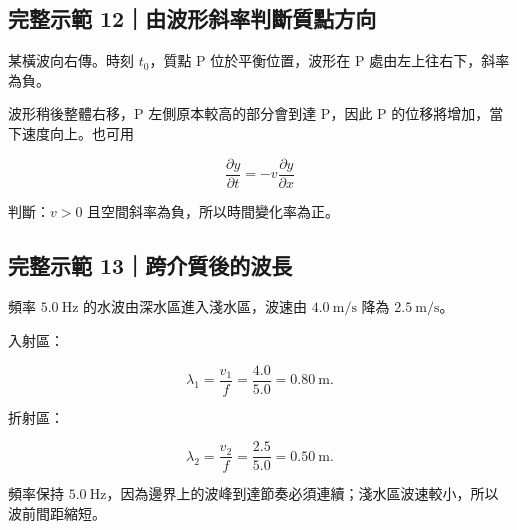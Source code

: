 \documentclass[11pt,a4paper]{article}
\begin{document}
\begin{HandoutWorkedExample}

\subsection{完整示範 12｜由波形斜率判斷質點方向}\label{ux5b8cux6574ux793aux7bc4-12ux7531ux6ce2ux5f62ux659cux7387ux5224ux65b7ux8ceaux9edeux65b9ux5411}

某橫波向右傳。時刻 \(t_0\)，質點 P 位於平衡位置，波形在 P 處由左上往右下，斜率為負。

波形稍後整體右移，P 左側原本較高的部分會到達 P，因此 P 的位移將增加，當下速度向上。也可用

\[
\frac{\partial y}{\partial t}=-v\frac{\partial y}{\partial x}
\]

判斷：\(v>0\) 且空間斜率為負，所以時間變化率為正。

\end{HandoutWorkedExample}

\begin{HandoutWorkedExample}

\subsection{完整示範 13｜跨介質後的波長}\label{ux5b8cux6574ux793aux7bc4-13ux8de8ux4ecbux8ceaux5f8cux7684ux6ce2ux9577}

頻率 \(5.0\ \mathrm{Hz}\) 的水波由深水區進入淺水區，波速由 \(4.0\ \mathrm{m/s}\) 降為 \(2.5\ \mathrm{m/s}\)。

入射區：

\[
\lambda_1=\frac{v_1}{f}=\frac{4.0}{5.0}=0.80\ \mathrm m.
\]

折射區：

\[
\lambda_2=\frac{v_2}{f}=\frac{2.5}{5.0}=0.50\ \mathrm m.
\]

頻率保持 \(5.0\ \mathrm{Hz}\)，因為邊界上的波峰到達節奏必須連續；淺水區波速較小，所以波前間距縮短。

\end{HandoutWorkedExample}
\end{document}
